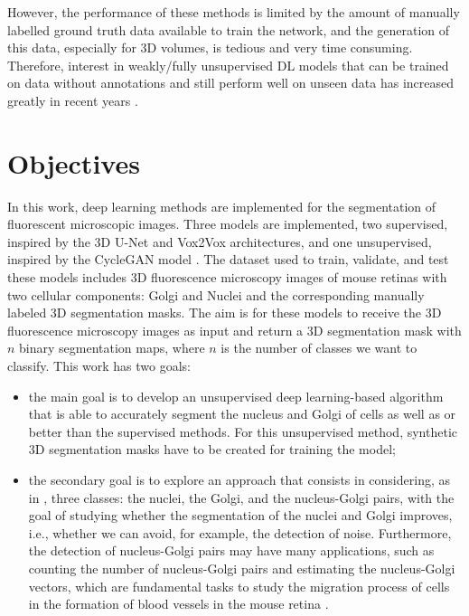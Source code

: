 However, the performance of these methods is limited by the amount of manually labelled ground truth data available to train the network, and the generation of this data, especially for \ac{3D} volumes, is tedious and very time consuming. Therefore, interest in weakly/fully unsupervised \ac{DL} models that can be trained on data without annotations and still perform well on unseen data has increased greatly in recent years \cite{review:3}.



\section{Objectives}
\label{section:objectives}

In this work, deep learning methods are implemented for the segmentation of fluorescent microscopic images. Three models are implemented, two supervised, inspired by the \ac{3D} U-Net \cite{Unet:3D} and Vox2Vox \cite{isola2018imagetoimage} architectures, and one unsupervised, inspired by the CycleGAN model \cite{cycleGAN:original}. The dataset used to train, validate, and test these models includes \ac{3D} fluorescence microscopy images of mouse retinas with two cellular components: Golgi and Nuclei and the corresponding manually labeled \ac{3D} segmentation masks. The aim is for these models to receive the \ac{3D} fluorescence microscopy images as input and return a \ac{3D} segmentation mask with $n$ binary segmentation maps, where $n$ is the number of classes we want to classify. This work has two goals:

\begin{itemize} 

\item the main goal is to develop an unsupervised deep learning-based algorithm that is able to accurately segment the nucleus and Golgi of cells as well as or better than the supervised methods. For this unsupervised method, synthetic \ac{3D} segmentation masks have to be created for training the model; 

\item the secondary goal is to explore an approach that consists in considering, as in \cite{nuclei&golgi}, three classes: the nuclei, the Golgi, and the nucleus-Golgi pairs, with the goal of studying whether the segmentation of the nuclei and Golgi improves, i.e., whether we can avoid, for example, the detection of noise. Furthermore, the detection of nucleus-Golgi pairs may have many applications, such as counting the number of nucleus-Golgi pairs and estimating the nucleus-Golgi vectors, which are fundamental tasks to study the migration process of cells in the formation of blood vessels in the mouse retina \cite{nuclei&golgi}.
\end{itemize}

